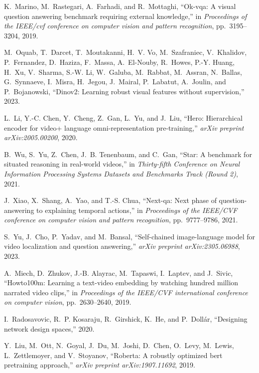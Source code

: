 \begin{thebibliography}{10}
K.~Marino, M.~Rastegari, A.~Farhadi, and R.~Mottaghi, ``Ok-vqa: A visual
  question answering benchmark requiring external knowledge,'' in {\em
  Proceedings of the IEEE/cvf conference on computer vision and pattern
  recognition}, pp.~3195--3204, 2019.

M.~Oquab, T.~Darcet, T.~Moutakanni, H.~V. Vo, M.~Szafraniec, V.~Khalidov,
  P.~Fernandez, D.~Haziza, F.~Massa, A.~El-Nouby, R.~Howes, P.-Y. Huang, H.~Xu,
  V.~Sharma, S.-W. Li, W.~Galuba, M.~Rabbat, M.~Assran, N.~Ballas, G.~Synnaeve,
  I.~Misra, H.~Jegou, J.~Mairal, P.~Labatut, A.~Joulin, and P.~Bojanowski,
  ``Dinov2: Learning robust visual features without supervision,'' 2023.

L.~Li, Y.-C. Chen, Y.~Cheng, Z.~Gan, L.~Yu, and J.~Liu, ``Hero: Hierarchical
  encoder for video+ language omni-representation pre-training,'' {\em arXiv
  preprint arXiv:2005.00200}, 2020.

B.~Wu, S.~Yu, Z.~Chen, J.~B. Tenenbaum, and C.~Gan, ``Star: A benchmark for
  situated reasoning in real-world videos,'' in {\em Thirty-fifth Conference on
  Neural Information Processing Systems Datasets and Benchmarks Track (Round
  2)}, 2021.

J.~Xiao, X.~Shang, A.~Yao, and T.-S. Chua, ``Next-qa: Next phase of
  question-answering to explaining temporal actions,'' in {\em Proceedings of
  the IEEE/CVF conference on computer vision and pattern recognition},
  pp.~9777--9786, 2021.

S.~Yu, J.~Cho, P.~Yadav, and M.~Bansal, ``Self-chained image-language model for
  video localization and question answering,'' {\em arXiv preprint
  arXiv:2305.06988}, 2023.

A.~Miech, D.~Zhukov, J.-B. Alayrac, M.~Tapaswi, I.~Laptev, and J.~Sivic,
  ``Howto100m: Learning a text-video embedding by watching hundred million
  narrated video clips,'' in {\em Proceedings of the IEEE/CVF international
  conference on computer vision}, pp.~2630--2640, 2019.

I.~Radosavovic, R.~P. Kosaraju, R.~Girshick, K.~He, and P.~Dollár, ``Designing
  network design spaces,'' 2020.

Y.~Liu, M.~Ott, N.~Goyal, J.~Du, M.~Joshi, D.~Chen, O.~Levy, M.~Lewis,
  L.~Zettlemoyer, and V.~Stoyanov, ``Roberta: A robustly optimized bert
  pretraining approach,'' {\em arXiv preprint arXiv:1907.11692}, 2019.


\end{thebibliography}
